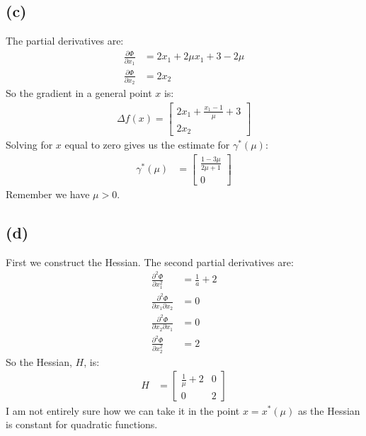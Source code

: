 \documentclass[a4paper, fleqn]{article}
\begin{document}
\subsection*{(c)}
The partial derivatives are:
\begin{align*}
  \frac{\partial \Phi}{\partial x_1} &= 2x_1+2\mu x_1+3-2\mu \\
  \frac{\partial \Phi}{\partial x_2} &= 2x_2
\end{align*}
So the gradient in a general point $x$ is:
\begin{align*}
\Delta f(x)=\begin{bmatrix} 2x_1+\frac{x_1-1}{\mu}+3 \\ 2x_2 \end{bmatrix}
\end{align*}
Solving for $x$ equal to zero gives us the estimate for $\gamma^*(\mu)$:
\begin{align*}
\gamma^*(\mu)&=\begin{bmatrix} \frac{1-3\mu}{2\mu+1} \\ 0 \end{bmatrix}
\end{align*}
Remember we have $\mu>0$.

\subsection*{(d)}
First we construct the Hessian. The second partial derivatives are:
\begin{align*}
  \frac{\partial^2 \Phi}{\partial x_1^2} &= \frac{1}{a}+2 \\
  \frac{\partial^2 \Phi}{\partial x_1\partial x_2} &= 0 \\
  \frac{\partial^2 \Phi}{\partial x_2\partial x_1} &= 0 \\
  \frac{\partial^2 \Phi}{\partial x_2^2} &= 2
\end{align*}
So the Hessian, $H$, is:
\begin{align*}
  H &= \begin{bmatrix}
         \frac{1}{\mu}+2 & 0 \\
         0 & 2
        \end{bmatrix}
\end{align*}
I am not entirely sure how we can take it in the point $x=x^*(\mu)$ as the Hessian is
constant for quadratic functions.
\end{document}
